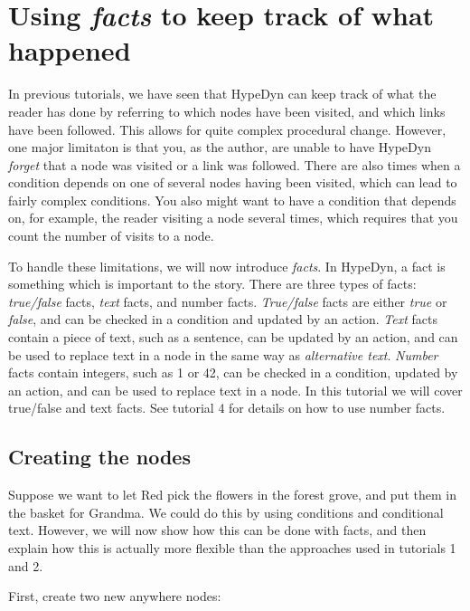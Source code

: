 \documentclass{article}
\begin{document}
\section{Using \textit{facts} to keep track of what happened}

In previous tutorials, we have seen that HypeDyn can keep track of what the
reader has done by referring to which nodes have been visited, and which links
have been followed. This allows for quite complex procedural change. However,
one major limitaton is that you, as the author, are unable to have HypeDyn
\textit{forget} that a node was visited or a link was followed. There are also
times when a condition depends on one of several nodes having been visited,
which can lead to fairly complex conditions. You also might want to have a
condition that depends on, for example, the reader visiting a node several
times, which requires that you count the number of visits to a node.

To handle these limitations, we will now introduce \textit{facts}. In HypeDyn, a
fact is something which is important to the story. There are three types of
facts: \textit{true/false} facts, \textit{text} facts, and number facts.
\textit{True/false} facts are either \textit{true} or \textit{false}, and can be
checked in a condition and updated by an action. \textit{Text} facts contain a
piece of text, such as a sentence, can be updated by an action, and can be used
to replace text in a node in the same way as \textit{alternative text}.
\textit{Number} facts contain integers, such as 1 or 42, can be checked in a
condition, updated by an action, and can be used to replace text in a node. In
this tutorial we will cover true/false and text facts. See tutorial 4 for
details on how to use number facts.

\subsection{Creating the nodes}

Suppose we want to let Red pick the flowers in the forest grove, and put them
in the basket for Grandma. We could do this by using conditions and conditional
text. However, we will now show how this can be done with facts, and then
explain how this is actually more flexible than the approaches used in
tutorials 1 and 2.

First, create two new anywhere nodes:
\end{document}
